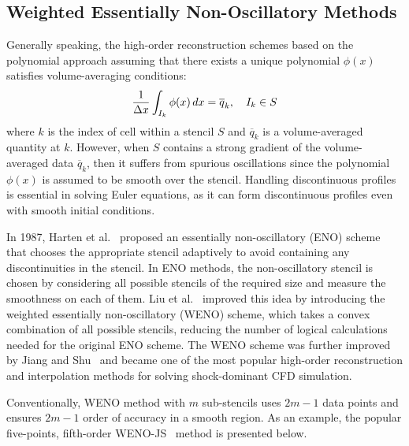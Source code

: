 \subsection{Weighted Essentially Non-Oscillatory Methods}\label{subsec:weno}

Generally speaking, the high-order reconstruction schemes based on the polynomial approach
assuming that there exists a unique polynomial \( \phi (x) \) satisfies volume-averaging conditions:
\begin{equation}\label{eq:recon_poly_linear}
    \frac{1}{\Delta x} \int_{I_{k}} \phi (x) \mathop{dx} = \overline{q}_{k}, \quad I_{k} \in S
\end{equation}
where \( k \) is the index of cell within a stencil \( S \) and \( \overline{q}_{k} \) is
a volume-averaged quantity at \( k \).
However, when \( S \) contains a strong gradient of the volume-averaged data \( \overline{q}_{k} \),
then it suffers from spurious oscillations since the polynomial \( \phi (x) \)
is assumed to be smooth over the stencil.
Handling discontinuous profiles is essential in solving Euler equations,
as it can form discontinuous profiles even with smooth initial conditions.

In 1987, Harten et al.~\cite{harten1987uniformly} proposed
an essentially non-oscillatory (ENO) scheme
that chooses the appropriate stencil adaptively to avoid containing any discontinuities in the stencil.
In ENO methods, the non-oscillatory stencil is chosen by considering
all possible stencils of the required size and measure the smoothness on each of them.
Liu et al.~\cite{liu1994weighted} improved this idea by introducing
the weighted essentially non-oscillatory (WENO) scheme,
which takes a convex combination of all possible stencils,
reducing the number of logical calculations needed for the original ENO scheme.
The WENO scheme was further improved by Jiang and Shu~\cite{jiang1996efficient}
and became one of the most popular high-order reconstruction and interpolation methods
for solving shock-dominant CFD simulation.

Conventionally, WENO method with \( m \) sub-stencils uses \( 2m-1 \) data points and
ensures \( 2m-1 \) order of accuracy in a smooth region.
As an example, the popular five-points, fifth-order WENO-JS~\cite{jiang1996efficient} method is presented below.

